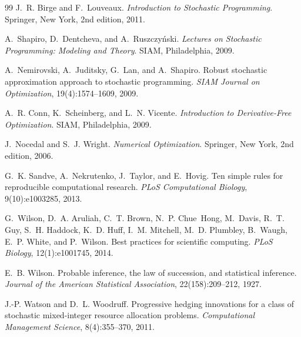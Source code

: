 \documentclass[11pt]{article}
\begin{document}
\begin{thebibliography}{99}
J.~R. Birge and F.~Louveaux.
\textit{Introduction to Stochastic Programming}.
Springer, New York, 2nd edition, 2011.

A.~Shapiro, D.~Dentcheva, and A.~Ruszczy\'nski.
\textit{Lectures on Stochastic Programming: Modeling and Theory}.
SIAM, Philadelphia, 2009.

A.~Nemirovski, A.~Juditsky, G.~Lan, and A.~Shapiro.
Robust stochastic approximation approach to stochastic programming.
\textit{SIAM Journal on Optimization}, 19(4):1574--1609, 2009.

A.~R. Conn, K.~Scheinberg, and L.~N. Vicente.
\textit{Introduction to Derivative-Free Optimization}.
SIAM, Philadelphia, 2009.

J.~Nocedal and S.~J. Wright.
\textit{Numerical Optimization}.
Springer, New York, 2nd edition, 2006.

G.~K. Sandve, A.~Nekrutenko, J.~Taylor, and E.~Hovig.
\newblock Ten simple rules for reproducible computational research.
\newblock \emph{PLoS Computational Biology}, 9(10):e1003285, 2013.

G.~Wilson, D.~A. Aruliah, C.~T. Brown, N.~P. Chue~Hong, M.~Davis, R.~T. Guy,
  S.~H. Haddock, K.~D. Huff, I.~M. Mitchell, M.~D. Plumbley, B.~Waugh,
  E.~P. White, and P.~Wilson.
\newblock Best practices for scientific computing.
\newblock \emph{PLoS Biology}, 12(1):e1001745, 2014.

E.~B. Wilson.
\newblock Probable inference, the law of succession, and statistical inference.
\newblock \emph{Journal of the American Statistical Association},
  22(158):209--212, 1927.

J.-P. Watson and D.~L. Woodruff.
Progressive hedging innovations for a class of stochastic mixed-integer
resource allocation problems.
\textit{Computational Management Science}, 8(4):355--370, 2011.

\end{thebibliography}
\end{document}
